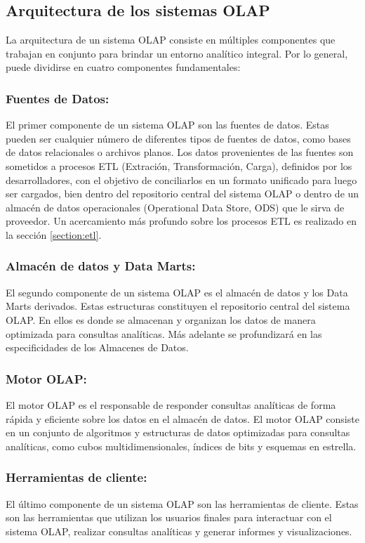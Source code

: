 \subsection{Arquitectura de los sistemas OLAP}

La arquitectura de un sistema OLAP consiste en múltiples componentes que trabajan en conjunto para brindar un entorno 
analítico integral. Por lo general, puede dividirse en cuatro componentes fundamentales\cite{nanda2019comprehensive}:

\subsubsection{Fuentes de Datos:}
El primer componente de un sistema OLAP son las fuentes de datos. Estas pueden ser cualquier número de diferentes 
tipos de fuentes de datos, como bases de datos relacionales o archivos planos. Los datos provenientes de las fuentes 
son sometidos a procesos ETL (Extraci\'on, Transformaci\'on, Carga), definidos por los desarrolladores, 
con el objetivo de conciliarlos en un formato unificado para luego ser cargados, bien dentro del repositorio central del sistema OLAP o 
dentro de un almacén de datos operacionales
(Operational Data Store, ODS) que le sirva de proveedor. Un acercamiento m\'as profundo sobre los procesos ETL es realizado 
en la sección \ref{section:etl}.

\subsubsection{Almacén de datos y Data Marts:}
El segundo componente de un sistema OLAP es el almacén de datos y los Data Marts derivados. Estas estructuras constituyen el repositorio central 
del sistema OLAP. En ellos es donde se almacenan y 
organizan los datos de manera optimizada para consultas analíticas. M\'as adelante se profundizar\'a en las especificidades 
de los Almacenes de Datos.

\subsubsection{Motor OLAP:}
El motor OLAP es el responsable de responder consultas analíticas de forma rápida y eficiente sobre 
los datos en el almacén de datos. El motor OLAP consiste en un conjunto de algoritmos y estructuras de datos 
optimizadas para consultas analíticas, como cubos multidimensionales, índices de bits y esquemas en estrella.

\subsubsection{Herramientas de cliente:}
El último componente de un sistema OLAP son las herramientas de cliente. Estas son las herramientas que utilizan los 
usuarios finales para interactuar con el sistema OLAP, realizar consultas analíticas y generar informes y visualizaciones.


